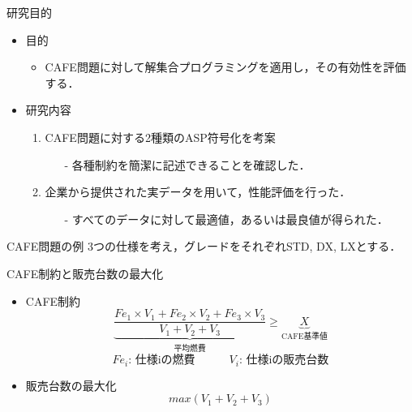 \documentclass[dvipdfmx, 11pt]{beamer}
\begin{document}
\begin{frame}{研究目的}
\begin{itemize}
	\setlength{\itemsep}{20pt}
	\item 目的
  	\begin{itemize}
   		\item CAFE問題に対して解集合プログラミングを適用し，その有効性を評価する．
  	\end{itemize}
  	\item 研究内容
  	\begin{enumerate}
		\setlength{\itemsep}{8pt}
   		\item CAFE問題に対する2種類のASP符号化を考案
   		\begin{itemize}
			\item[-] 各種制約を簡潔に記述できることを確認した．
		\end{itemize}
   		\item 企業から提供された実データを用いて，性能評価を行った．
		\begin{itemize}
			\item[-] すべてのデータに対して最適値，あるいは最良値が得られた．
		\end{itemize}
  	\end{enumerate}
\end{itemize}
\end{frame}
\begin{frame}{CAFE問題の例}
	3つの仕様を考え，グレードをそれぞれSTD, DX, LXとする．
\end{frame}
\begin{frame}{CAFE制約と販売台数の最大化}
 \begin{itemize}
 \setlength{\itemsep}{20pt}
 \item CAFE制約
 \[ 
 	\underbrace{
		\frac{Fe_{1} \times V_1 + Fe_{2} \times V_2 + Fe_{3} \times V_3 }{V_1 + V_2 + V_3}
	}_{\mbox{平均燃費}}
	\geq 
	\underbrace{X}_{\mbox{CAFE基準値}}
 \]
 \[
Fe_i \mbox{: 仕様iの燃費}\hspace{3em} V_i\mbox{: 仕様iの販売台数}
\]
 \item 販売台数の最大化
 \[
 	max(V_1+V_2+V_3)
 \]
 \end{itemize}
\end{frame}
\end{document}
